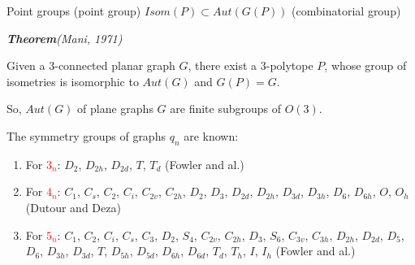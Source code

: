 \documentclass[%
pdf,
colorBG,
slideColor,
]{prosper}
\begin{document}



\begin{slide}{Point groups}
(point group) $Isom(P)\subset Aut(G(P))$ (combinatorial group)

{\em {\bf Theorem}(Mani, 1971)

Given a $3$-connected planar graph $G$, there exist a $3$-polytope $P$, whose group of isometries is isomorphic to $Aut(G)$ and $G(P)=G$.
}

\vspace{3mm}

So, $Aut(G)$ of plane graphs $G$ are finite subgroups of $O(3)$.

The symmetry groups of graphs $q_n$ are known:

\begin{enumerate}
\item[\ding{108}] For \textcolor{red}{$3_n$}: $D_{2}$, $D_{2h}$, $D_{2d}$, $T$, $T_d$ (Fowler and al.)

\item[\ding{108}] For \textcolor{red}{$4_n$}: $C_1$, $C_s$, $C_2$, $C_{i}$, $C_{2v}$, $C_{2h}$, $D_2$, $D_3$, $D_{2d}$, $D_{2h}$, $D_{3d}$, $D_{3h}$, $D_6$, $D_{6h}$, $O$, $O_h$ (Dutour and Deza)
\item[\ding{108}] For \textcolor{red}{$5_n$}: $C_1$, $C_2$, $C_i$, $C_s$, $C_3$, $D_2$, $S_4$, $C_{2v}$, $C_{2h}$, $D_3$, $S_6$, $C_{3v}$, $C_{3h}$, $D_{2h}$, $D_{2d}$, $D_5$, $D_6$, $D_{3h}$, $D_{3d}$, $T$, $D_{5h}$, $D_{5d}$, $D_{6h}$, $D_{6d}$, $T_d$, $T_h$, $I$, $I_h$ (Fowler and al.)
\end{enumerate}

\end{slide}
\end{document}
